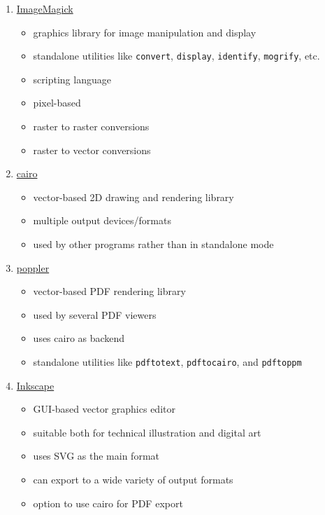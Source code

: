 \documentclass[
  11pt,
  british,
  a4paper,
]{article}
\providecommand{\tightlist}{%
  \setlength{\itemsep}{0pt}\setlength{\parskip}{0pt}}
\begin{document}
\begin{enumerate}
\tightlist
\item
  \href{https://imagemagick.org/index.php}{ImageMagick}

  \begin{itemize}
  \tightlist
  \item
    graphics library for image manipulation and display
  \item
    standalone utilities like \texttt{convert}, \texttt{display},
    \texttt{identify}, \texttt{mogrify}, etc.
  \item
    scripting language
  \item
    pixel-based
  \item
    raster to raster conversions
  \item
    raster to vector conversions
  \end{itemize}
\item
  \href{https://www.cairographics.org/}{cairo}

  \begin{itemize}
  \tightlist
  \item
    vector-based 2D drawing and rendering library
  \item
    multiple output devices/formats
  \item
    used by other programs rather than in standalone mode
  \end{itemize}
\item
  \href{https://poppler.freedesktop.org/}{poppler}

  \begin{itemize}
  \tightlist
  \item
    vector-based PDF rendering library
  \item
    used by several PDF viewers
  \item
    uses cairo as backend
  \item
    standalone utilities like \texttt{pdftotext}, \texttt{pdftocairo},
    and \texttt{pdftoppm}
  \end{itemize}
\item
  \href{https://inkscape.org/}{Inkscape}

  \begin{itemize}
  \tightlist
  \item
    GUI-based vector graphics editor
  \item
    suitable both for technical illustration and digital art
  \item
    uses SVG as the main format
  \item
    can export to a wide variety of output formats
  \item
    option to use cairo for PDF export
  \end{itemize}
\end{enumerate}
\end{document}
